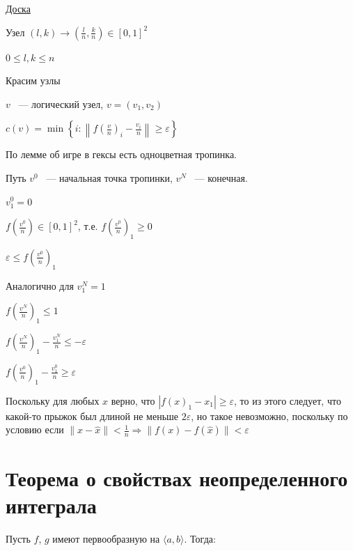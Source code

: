 \documentclass{article}
\begin{document}
				\underline{Доска}
				
				Узел $(l, k) \rightarrow (\frac{l}{n}, \frac{k}{n}) \in [0, 1]^2$
				
				$0 \leq l, k \leq n$
				
				Красим узлы
				
				$v$ ~--- логический узел, $v = (v_1, v_2)$
				
				$c(v) = \min \left\{ i : \left\| f(\frac{v}{n})_i - \frac{v_i}{n} \right\| \geq \varepsilon \right\}$
			
				По лемме об игре в гексы есть одноцветная тропинка.
				
				Путь $v^0$ ~--- начальная точка тропинки, $v^N$ ~--- конечная.
				
				$v^0_1 = 0$
				
				$f(\frac{v^0}{n}) \in [0, 1]^2$, т.е. $f(\frac{v^0}{n})_1 \geq 0$
				
				$\varepsilon \leq f(\frac{v^0}{n})_1$
				
				Аналогично для $v^N_1 = 1$
				
				$f(\frac{v^N}{n})_1 \leq 1$
				
				$f(\frac{v^N}{n})_1 - \frac{v^N_1}{n} \leq -\varepsilon$
				
				$f(\frac{v^0}{n})_1 - \frac{v^0_1}{n} \geq \varepsilon$
	
				Поскольку для любых $x$ верно, что $|f(x)_1 - x_1| \geq \varepsilon$, то из этого следует, что какой-то прыжок был длиной не меньше $2 \varepsilon$, но такое невозможно, поскольку по условию если $\| x - \widehat{x} \| < \frac{1}{n} \Rightarrow \| f(x) - f(\widehat{x}) \| < \varepsilon$
				
				
	\newpage

	\section{Теорема о свойствах неопределенного интеграла}
	
		Пусть $f$, $g$ имеют первообразную на $\langle a, b \rangle$. Тогда:
		
\end{document}
